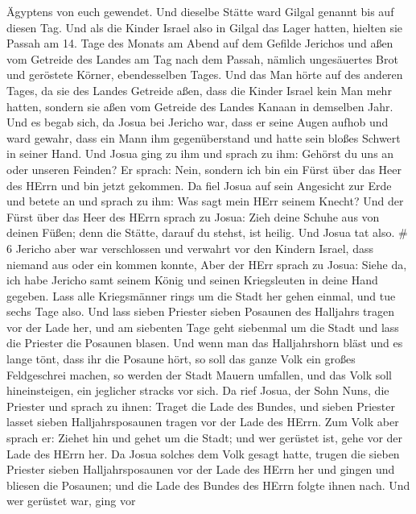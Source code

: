 Ägyptens von euch gewendet. Und dieselbe Stätte ward Gilgal genannt bis
auf diesen Tag.  Und als die Kinder Israel also in Gilgal
das Lager hatten, hielten sie Passah am 14. Tage des Monats am Abend auf
dem Gefilde Jerichos  und aßen vom Getreide des Landes am
Tag nach dem Passah, nämlich ungesäuertes Brot und geröstete Körner,
ebendesselben Tages.  Und das Man hörte auf des anderen
Tages, da sie des Landes Getreide aßen, dass die Kinder Israel kein Man
mehr hatten, sondern sie aßen vom Getreide des Landes Kanaan in
demselben Jahr.  Und es begab sich, da Josua bei Jericho
war, dass er seine Augen aufhob und ward gewahr, dass ein Mann ihm
gegenüberstand und hatte sein bloßes Schwert in seiner Hand. Und Josua
ging zu ihm und sprach zu ihm: Gehörst du uns an oder unseren Feinden?
 Er sprach: Nein, sondern ich bin ein Fürst über das Heer
des HErrn und bin jetzt gekommen. Da fiel Josua auf sein Angesicht zur
Erde und betete an und sprach zu ihm: Was sagt mein HErr seinem Knecht?
 Und der Fürst über das Heer des HErrn sprach zu Josua:
Zieh deine Schuhe aus von deinen Füßen; denn die Stätte, darauf du
stehst, ist heilig. Und Josua tat also. \# 6  Jericho aber
war verschlossen und verwahrt vor den Kindern Israel, dass niemand aus
oder ein kommen konnte,  Aber der HErr sprach zu Josua:
Siehe da, ich habe Jericho samt seinem König und seinen Kriegsleuten in
deine Hand gegeben.  Lass alle Kriegsmänner rings um die
Stadt her gehen einmal, und tue sechs Tage also.  Und lass
sieben Priester sieben Posaunen des Halljahrs tragen vor der Lade her,
und am siebenten Tage geht siebenmal um die Stadt und lass die Priester
die Posaunen blasen.  Und wenn man das Halljahrshorn bläst
und es lange tönt, dass ihr die Posaune hört, so soll das ganze Volk ein
großes Feldgeschrei machen, so werden der Stadt Mauern umfallen, und das
Volk soll hineinsteigen, ein jeglicher stracks vor sich.  Da
rief Josua, der Sohn Nuns, die Priester und sprach zu ihnen: Traget die
Lade des Bundes, und sieben Priester lasset sieben Halljahrsposaunen
tragen vor der Lade des HErrn.  Zum Volk aber sprach er:
Ziehet hin und gehet um die Stadt; und wer gerüstet ist, gehe vor der
Lade des HErrn her.  Da Josua solches dem Volk gesagt hatte,
trugen die sieben Priester sieben Halljahrsposaunen vor der Lade des
HErrn her und gingen und bliesen die Posaunen; und die Lade des Bundes
des HErrn folgte ihnen nach.  Und wer gerüstet war, ging vor
